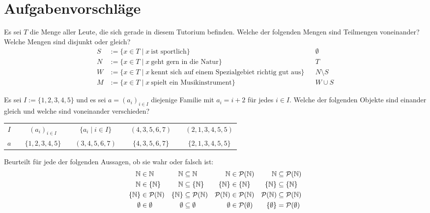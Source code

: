 \section{Aufgabenvorschläge}


\begin{aufg}[Kennenlernen]
    Es sei $T$ die Menge aller Leute, die sich gerade in diesem Tutorium befinden.
    Welche der folgenden Mengen sind Teilmengen voneinander? Welche Mengen sind disjunkt oder gleich?
    \begin{align*}
        S&:= \{ x\in T \mid x\ \text{ist sportlich} \}  && \emptyset  \\
        N&:=  \{ x\in T \mid x\ \text{geht gern in die Natur} \} && T \\
        W & := \{ x\in T \mid x\ \text{kennt sich auf einem Spezialgebiet richtig gut aus} \} &&  N\setminus S  \\
        M &:= \{ x \in T \mid x\ \text{spielt ein Musikinstrument} \} && W \cup S
    \end{align*}
\end{aufg}


\begin{aufg}
    Es sei $I:=\{1,2,3,4,5\}$ und es sei $a=(a_i)_{i\in I}$ diejenige Familie mit $a_i=i+2$ für jedes $i\in I$. Welche der folgenden Objekte sind einander gleich und welche sind voneinander verschieden?
    \begin{center}
    {\renewcommand{\arraystretch}{1.6}
    \begin{tabular}{ccccccccc}
        $I$ && $(a_i)_{i\in I}$&& $\{a_i\mid i\in I\}$ && $(4,3,5,6,7)$ && $(2,1,3,4,5,5)$ \\
        $a$ && $\{1,2,3,4,5\}$ && $(3,4,5,6,7)$ && $\{4,3,5,6,7\}$ && $\{2,1,3,4,5,5\}$
	\end{tabular}}
    \end{center}
\end{aufg}


\begin{aufg}
    Beurteilt für jede der folgenden Aussagen, ob sie wahr oder falsch ist:
    \begin{align*}
        \mathbb N&  \in \mathbb N & \mathbb N & \subseteq \mathbb N & \mathbb N & \in \mathcal P(\mathbb N) &  \mathbb N & \subseteq \mathcal P(\mathbb N) \\
        \mathbb N & \in \{ \mathbb N\} & \mathbb N & \subseteq \{ \mathbb N\} & \{ \mathbb N\} & \in \{ \mathbb N\} & \{\mathbb N\} & \subseteq \{ \mathbb N\} \\
        \{\mathbb N\} & \in \mathcal P(\mathbb N) & \{ \mathbb N\} & \subseteq \mathcal P(\mathbb N) & \mathcal P(\mathbb N) & \in \mathcal P(\mathbb N) & \mathcal P(\mathbb N) & \subseteq \mathcal P(\mathbb N) \\
        \emptyset & \in \emptyset & \emptyset &\subseteq \emptyset & \emptyset & \in \mathcal P(\emptyset) & \{\emptyset\} & = \mathcal P(\emptyset)
    \end{align*}
\end{aufg}


